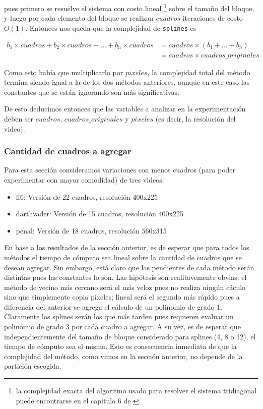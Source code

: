 pues primero se resuelve el sistema con costo lineal \footnote{la complejidad exacta del algoritmo usado para resolver el sistema tridiagonal puede encontrarse en el capítulo 6 de \cite{burden}} sobre el tamaño del bloque, y luego por cada elemento del bloque se realizan $cuadros$ iteraciones de costo $O(1)$. Entonces nos queda que la complejidad de \texttt{splines} es

\begin{equation*}
\begin{split}
b_1 \times cuadros + b_2 \times cuadros + ... + b_n \times cuadros & = cuadros \times (b_1 + ... + b_n) \\
& = cuadros \times cuadros\_originales
\end{split}
\end{equation*}

Como esto había que multiplicarlo por $pixeles$, la complejidad total del método termina siendo igual a la de los dos métodos anteriores, aunque en este caso las constantes que se están ignorando son más significativas.

De esto deducimos entonces que las variables a analizar en la experimentación deben ser $cuadros$,  $cuadros\_originales$ y $pixeles$ (es decir, la resolución del video).

\subsubsection{Cantidad de cuadros a agregar}
Para esta sección consideramos variaciones con menos cuadros (para poder experimentar con mayor comodidad) de tres videos:
\begin{itemize}
	\item ff6: Versión de 22 cuadros, resolución 400x225
	\item darthvader: Versión de 15 cuadros, resolución 400x225
	\item penal: Versión de 18 cuadros, resolución 560x315
\end{itemize}

En base a los resultados de la sección anterior, es de esperar que para todos los métodos el tiempo de cómputo sea lineal sobre la cantidad de cuadros que se desean agregar. Sin embargo, está claro que las pendientes de cada método serán distintas pues las constantes lo son.  
Las hipótesis son realitavemente obvias: el método de vecino más cercano será el más veloz pues no realiza ningún cáculo sino que simplemente copia píxeles; lineal será el segundo más rápido pues a diferencia del anterior se agrega el cálculo de un polinomio de grado 1. Claramente los splines serán los que más tarden pues requieren evaluar un polinomio de grado 3 por cada cuadro a agregar. A su vez, es de esperar que independientemente del tamaño de bloque considerado para splines (4, 8 o 12), el tiempo de cómputo sea el mismo. Esto es consecuencia inmediata de que la complejidad del método, como vimos en la sección anterior, no depende de la partición escogida.


